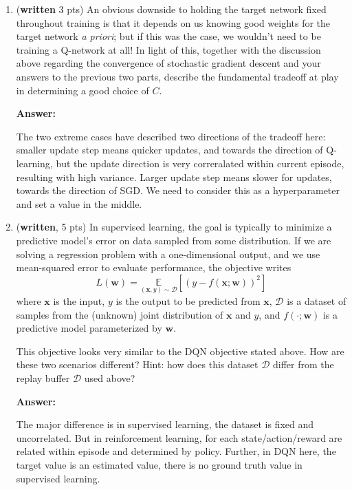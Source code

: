 \documentclass{article}
\begin{document}
\begin{enumerate}
\item (\textbf{written} 3 pts) An obvious downside to holding the target network fixed throughout training is that it depends on us knowing good weights for the target network \textit{a priori}; but if this was the case, we wouldn't need to be training a Q-network at all! In light of this, together with the discussion above regarding the convergence of stochastic gradient descent and your answers to the previous two parts, describe the fundamental tradeoff at play in determining a good choice of $C$.

\textbf{Answer:}

The two extreme cases have described two directions of the tradeoff here: smaller update step means quicker updates, and towards the direction of Q-learning, but the update direction is very correralated within current episode, resulting with high variance. Larger update step means slower for updates, towards the direction of SGD. We need to consider this as a hyperparameter and set a value in the middle.

\item (\textbf{written}, 5 pts) In supervised learning, the goal is typically to minimize a predictive model's error on data sampled from some distribution.
If we are solving a regression problem with a one-dimensional output, and we use mean-squared error to evaluate performance, the objective writes
\[
L(\mathbf{w}) = \underset{(\mathbf{x},y) \sim \mathcal{D}}{\mathbb{E}}[(y - f(\mathbf{x}; \mathbf{w}))^2]
\]
where $\mathbf{x}$ is the input, $y$ is the output to be predicted from $\mathbf{x}$, $\mathcal{D}$ is a dataset of samples from the (unknown) joint distribution of $\mathbf{x}$ and $y$, and $f(\cdot; \mathbf{w})$ is a predictive model parameterized by $\mathbf{w}$.

This objective looks very similar to the DQN objective stated above.
How are these two scenarios different? Hint: how does this dataset $\mathcal{D}$ differ from the replay buffer $\mathcal{D}$ used above?

\textbf{Answer:}

The major difference is in supervised learning, the dataset is fixed and uncorrelated. But in reinforcement learning, for each state/action/reward are related within episode and determined by policy. Further, in DQN here, the target value is an estimated value, there is no ground truth value in supervised learning.

\end{enumerate}
\end{document}
